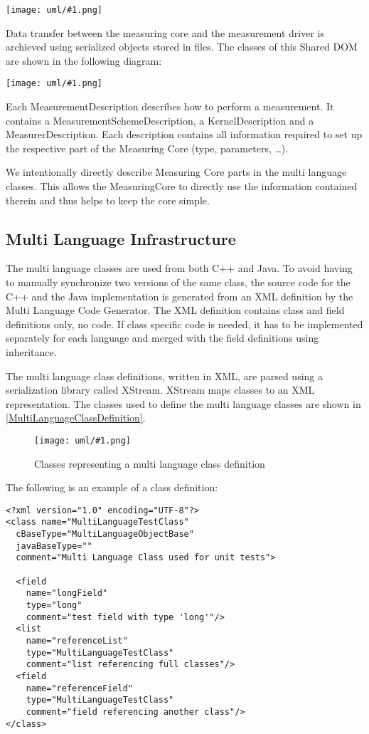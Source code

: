 \documentclass[a4paper,12pt]{article}
\newcommand{\umlDiagram}[1]{\begin{center}\texttt{[image: uml/\#1.png]}\end{center}}
\newcommand{\umlFloat}[2]{
\begin{figure}[tbh]
\umlDiagram{#1}
\caption{#2}
\label{#1}
\end{figure}
}
\newcommand{\umlRef}[1]{\autoref{#1}}
\begin{document}
\umlDiagram{ToolComponents}

Data transfer between the measuring core and the measurement driver is archieved using serialized objects stored in files. The classes of this Shared DOM are shown in the following diagram:

\umlDiagram{MultiLanguageClasses}

Each MeasurementDescription describes how to perform a measurement. It contains a MeasurementSchemeDescription, a KernelDescription and a MeasurerDescription. Each description contains all information required to set up the respective part of the Measuring Core (type, parameters, \ldots).

We intentionally directly describe Measuring Core parts in the multi language classes. This allows the MeasuringCore to directly use the information contained therein and thus helps to keep the core simple.

\subsection{Multi Language Infrastructure}
The multi language classes are used from both C++ and Java. To avoid having to manually synchronize two versions of the same class, the source code for the C++ and the Java implementation is generated from an XML definition by the Multi Language Code Generator. The XML definition contains class and field definitions only, no code. If class specific code is needed, it has to be implemented separately for each language and merged with the field definitions using inheritance.

The multi language class definitions, written in XML, are parsed using a serialization library called XStream. XStream maps classes to an XML representation. The classes used to define the multi language classes are shown in \umlRef{MultiLanguageClassDefinition}.

\umlFloat{MultiLanguageClassDefinition}{Classes representing a multi language class definition}

The following is an example of a class definition:
\begin{verbatim}
<?xml version="1.0" encoding="UTF-8"?>
<class name="MultiLanguageTestClass" 
  cBaseType="MultiLanguageObjectBase"
  javaBaseType=""
  comment="Multi Language Class used for unit tests">

  <field 
    name="longField" 
    type="long" 
    comment="test field with type 'long'"/>
  <list  
    name="referenceList" 
    type="MultiLanguageTestClass" 
    comment="list referencing full classes"/>
  <field 
    name="referenceField" 
    type="MultiLanguageTestClass" 
    comment="field referencing another class"/>
</class>
\end{verbatim}
\end{document}
